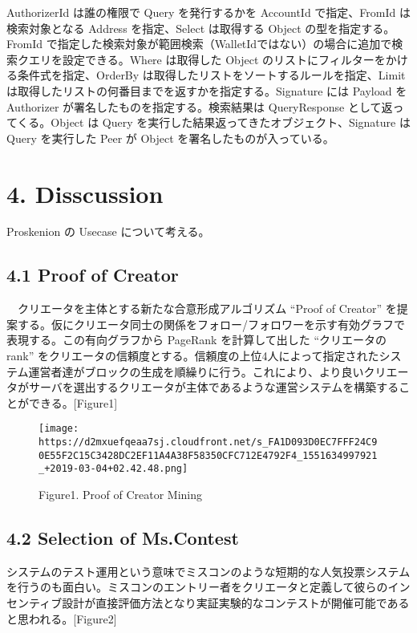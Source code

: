 AuthorizerId は誰の権限で Query を発行するかを AccountId で指定、FromId
は検索対象となる Address を指定、Select は取得する Object
の型を指定する。FromId
で指定した検索対象が範囲検索（WalletIdではない）の場合に追加で検索クエリを設定できる。Where
は取得した Object のリストにフィルターをかける条件式を指定、OrderBy
は取得したリストをソートするルールを指定、Limit
は取得したリストの何番目までを返すかを指定する。Signature には Payload
を Authorizer が署名したものを指定する。検索結果は QueryResponse
として返ってくる。Object は Query
を実行した結果返ってきたオブジェクト、Signature は Query を実行した Peer
が Object を署名したものが入っている。

\hypertarget{disscussion}{%
\chapter{4. Disscussion}\label{disscussion}}

Proskenion の Usecase について考える。

\hypertarget{proof-of-creator}{%
\section{4.1 Proof of Creator}\label{proof-of-creator}}

　クリエータを主体とする新たな合意形成アルゴリズム ``Proof of Creator''
を提案する。仮にクリエータ同士の関係をフォロー/フォロワーを示す有効グラフで表現する。この有向グラフから
PageRank を計算して出した ``クリエータのrank''
をクリエータの信頼度とする。信頼度の上位4人によって指定されたシステム運営者達がブロックの生成を順繰りに行う。これにより、より良いクリエータがサーバを選出するクリエータが主体であるような運営システムを構築することができる。{[}Figure1{]}

\begin{figure}
\centering
\texttt{[image: https://d2mxuefqeaa7sj.cloudfront.net/s\_FA1D093D0EC7FFF24C90E55F2C15C3428DC2EF11A4A38F58350CFC712E4792F4\_1551634997921\_+2019-03-04+02.42.48.png]}
\caption{Figure1. Proof of Creator Mining}
\end{figure}

\hypertarget{selection-of-ms.contest}{%
\section{4.2 Selection of Ms.Contest}\label{selection-of-ms.contest}}

システムのテスト運用という意味でミスコンのような短期的な人気投票システムを行うのも面白い。ミスコンのエントリー者をクリエータと定義して彼らのインセンティブ設計が直接評価方法となり実証実験的なコンテストが開催可能であると思われる。{[}Figure2{]}

